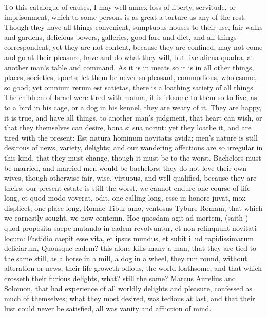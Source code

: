 {\lettrine{T}{o} this catalogue of causes, I may well annex loss of liberty,
servitude, or imprisonment, which to some persons is as great a torture
as any of the rest. Though they have all things convenient, sumptuous
houses to their use, fair walks and gardens, delicious bowers,
galleries, good fare and diet, and all things correspondent, yet they
are not content, because they are confined, may not come and go at
their pleasure, have and do what they will, but live aliena
quadra, at another man's table and command. As it is in meats so
it is in all other things, places, societies, sports; let them be never
so pleasant, commodious, wholesome, so good; yet omnium rerum est
satietas, there is a loathing satiety of all things. The children of
Israel were tired with manna, it is irksome to them so to live, as to a
bird in his cage, or a dog in his kennel, they are weary of it. They
are happy, it is true, and have all things, to another man's judgment,
that heart can wish, or that they themselves can desire, bona si sua
norint: yet they loathe it, and are tired with the present: Est natura
hominum novitatis avida; men's nature is still desirous of news,
variety, delights; and our wandering affections are so irregular in
this kind, that they must change, though it must be to the worst.
Bachelors must be married, and married men would be bachelors; they do
not love their own wives, though otherwise fair, wise, virtuous, and
well qualified, because they are theirs; our present estate is still
the worst, we cannot endure one course of life long, et quod modo
voverat, odit, one calling long, esse in honore juvat, mox displicet;
one place long, Romae Tibur amo, ventosus Tybure Romam, that
which we earnestly sought, we now contemn. Hoc quosdam agit ad mortem,
(saith \Seneca) quod proposita saepe mutando in eadem revolvuntur,
et non relinquunt novitati locum: Fastidio caepit esse vita, et ipsus
mundus, et subit illud rapidissimarum deliciarum, Quousque eadem? this
alone kills many a man, that they are tied to the same still, as a
horse in a mill, a dog in a wheel, they run round, without alteration
or news, their life groweth odious, the world loathsome, and that which
crosseth their furious delights, what? still the same? Marcus Aurelius
and Solomon, that had experience of all worldly delights and pleasure,
confessed as much of themselves; what they most desired, was tedious at
last, and that their lust could never be satisfied, all was vanity and
affliction of mind.

}

